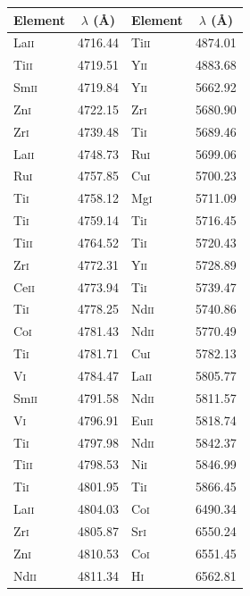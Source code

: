 \begin{table}[]
    \centering
    \begin{tabular}{|l|c||l|c|}
    \hline
    Element & $\lambda$ (\AA) & Element & $\lambda$ (\AA) \\
    \hline
La\textsc{ii} & 4716.44 &   Ti\textsc{ii} & 4874.01 \\
Ti\textsc{ii} & 4719.51 & Y\textsc{ii} & 4883.68 \\ 
Sm\textsc{ii} & 4719.84 &   Y\textsc{ii} & 5662.92 \\ 
Zn\textsc{i} & 4722.15 &  Zr\textsc{i} & 5680.90 \\   
Zr\textsc{i} & 4739.48 &   Ti\textsc{i} & 5689.46 \\  
La\textsc{ii} & 4748.73 &   Ru\textsc{i} & 5699.06 \\ 
Ru\textsc{i} & 4757.85 &  Cu\textsc{i} & 5700.23 \\
Ti\textsc{i} & 4758.12 & Mg\textsc{i} & 5711.09 \\ 
Ti\textsc{i} & 4759.14 & Ti\textsc{i} & 5716.45 \\  
Ti\textsc{ii} & 4764.52 & Ti\textsc{i} & 5720.43 \\
Zr\textsc{i} & 4772.31 &   Y\textsc{ii} & 5728.89 \\ 
Ce\textsc{ii} & 4773.94 &  Ti\textsc{i} & 5739.47 \\ 
Ti\textsc{i} & 4778.25 & Nd\textsc{ii} & 5740.86 \\ 
Co\textsc{i} & 4781.43 & Nd\textsc{ii} & 5770.49 \\ 
Ti\textsc{i} & 4781.71 & Cu\textsc{i} & 5782.13 \\ 
V\textsc{i} & 4784.47 &  La\textsc{ii} & 5805.77 \\  
Sm\textsc{ii} & 4791.58 &   Nd\textsc{ii} & 5811.57 \\  
V\textsc{i} & 4796.91 &   Eu\textsc{ii} & 5818.74 \\
Ti\textsc{i} & 4797.98 & Nd\textsc{ii} & 5842.37 \\ 
Ti\textsc{ii} & 4798.53 & Ni\textsc{i} & 5846.99 \\
Ti\textsc{i} & 4801.95 & Ti\textsc{i} & 5866.45 \\
La\textsc{ii} & 4804.03 & Co\textsc{i} & 6490.34 \\
Zr\textsc{i} & 4805.87 &   Sr\textsc{i} & 6550.24 \\ 
Zn\textsc{i} & 4810.53 &   Co\textsc{i} & 6551.45 \\
Nd\textsc{ii} & 4811.34 &  H\textsc{i} & 6562.81 \\   

\end{tabular}
\end{table}
